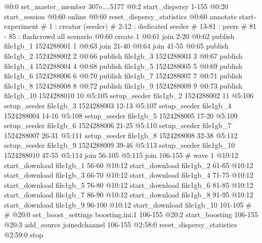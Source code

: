 
\begin{verbbox}
@0:0 set_master_member 307e....5177
@0:2 start_dispersy {1-155}
@0:20 start_session
@0:60 online
@0:60 reset_dispersy_statistics
@0:60 annotate start-experiment
# 1 : creator (seeder)
# 2-12 : dedicated seeder
# 13-81 : peers
# 81 - 85 : flashcrowd all scenario
@0:60 create {1}
@0:61 join {2-20}
@0:62 publish file1gb_1 1524288001 {1}
@0:63 join {21-40}
@0:64 join {41-55}
@0:65 publish file1gb_2 1524288002 {2}
@0:66 publish file1gb_3 1524288003 {3}
@0:67 publish file1gb_4 1524288004 {4}
@0:68 publish file1gb_5 1524288005 {5}
@0:69 publish file1gb_6 1524288006 {6}
@0:70 publish file1gb_7 1524288007 {7}
@0:71 publish file1gb_8 1524288008 {8}
@0:72 publish file1gb_9 1524288009 {9}
@0:73 publish file1gb_10 1524288010 {10}
@5:105 setup_seeder file1gb_2 1524288002 {11}
@5:106 setup_seeder file1gb_3 1524288003 {12-13}
@5:107 setup_seeder file1gb_4 1524288004 {14-16}
@5:108 setup_seeder file1gb_5 1524288005 {17-20}
@5:109 setup_seeder file1gb_6 1524288006 {21-25}
@5:110 setup_seeder file1gb_7 1524288007 {26-31}
@5:111 setup_seeder file1gb_8 1524288008 {32-38}
@5:112 setup_seeder file1gb_9 1524288009 {39-46}
@5:113 setup_seeder file1gb_10 1524288010 {47-55}
@5:114 join {56-105}
@5:115 join {106-155}
# wave 1
@10:12 start_download file1gb_1 {56-60}
@10:12 start_download file1gb_2 {61-65}
@10:12 start_download file1gb_3 {66-70}
@10:12 start_download file1gb_4 {71-75}
@10:12 start_download file1gb_5 {76-80}
@10:12 start_download file1gb_6 {81-85}
@10:12 start_download file1gb_7 {86-90}
@10:12 start_download file1gb_8 {91-95}
@10:12 start_download file1gb_9 {96-100}
@10:12 start_download file1gb_10 {101-105}
# # @20:0 set_boost_settings boosting.ini.1 {106-155}
@20:2 start_boosting {106-155}
@20:3 add_source joinedchannel {106-155}
@2:58:0 reset_dispersy_statistics
@2:59:0 stop
\end{verbbox}

